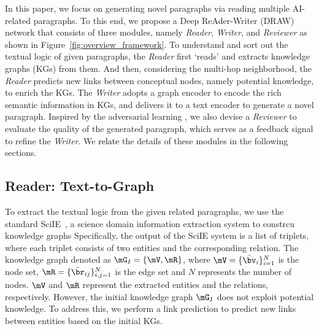 \documentclass[letterpaper]{article}
\def\hmg{\textcolor{black}}
\begin{document}
In this paper, we focus on generating novel paragraphs via reading multiple AI-related paragraphs. To this end, we propose a Deep ReAder-Writer (DRAW) network that
consists of three modules, namely \textit{Reader}, \textit{Writer}, and \textit{Reviewer} as shown in Figure~\ref{fig:overview_framework}. 
To understand and sort out the textual logic of given paragraphs, the \textit{Reader} first `reads' and extracts {knowledge graphs} (KGs) from them. And then, considering the multi-hop neighborhood, the \textit{Reader} 
predicts new links between conceptual nodes, namely potential knowledge, to enrich the KGs.
The \textit{Writer} adopts a graph encoder to encode the rich semantic information in KGs, and delivers it to a text encoder to generate a novel paragraph.
{Inspired by the adversarial learning \cite{cao2019multi, wang2018graphgan, cao2020pami, Chen2020Generating}, }
we also devise a \textit{Reviewer} to evaluate the quality of the generated paragraph, which serves as a feedback signal to refine the \textit{Writer}.
We \hmg{relate} the details of these modules in the following sections.


\subsection{Reader: Text-to-Graph}
To extract the textual logic from the given related paragraphs, we use the standard SciIE~\cite{Luan2018MultiTaskIO}, a science domain information extraction system 
{to constrcu knowledge graphs}
Specifically, the output of the SciIE system is a list of triplets, where each triplet consists of two entities and the corresponding relation. 
The knowledge graph denoted as
$\mG_{I}=\{\mV, \mR\}$, 
where $ \mV = \{ \bar{\bv}_i\}^{N}_{i=1} $ is the node set, $ \mR = \{\bar{\br}_{ij}\}^{N}_{i,j=1} $ is the edge set and $N$ represents the number of nodes.
$\mV$ and $\mR$ represent the extracted entities and the relations, respectively.
However, the initial knowledge graph $\mG_{I}$ does not exploit potential knowledge.
To address this, we perform a link prediction to predict new links between entities based on the initial KGs.
\end{document}
